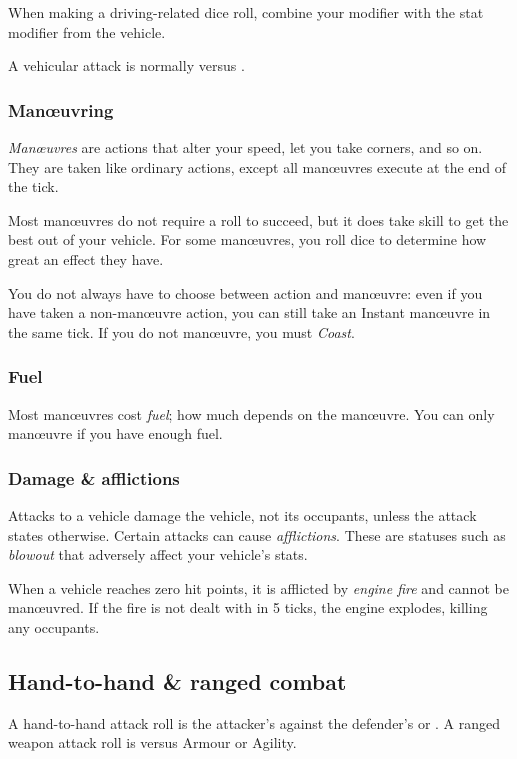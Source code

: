 \documentclass[10pt, a4paper, twocolumn]{article}
\begin{document}
When making a driving-related dice roll, combine your 
modifier with the stat modifier from the vehicle.

A vehicular attack is normally  versus .

\subsubsection{Man\oe{}uvring}
\emph{Man\oe{}uvres} are actions that alter your speed, let you take corners,
and so on. They are taken like ordinary actions, except all man\oe{}uvres
execute at the end of the tick.

Most man\oe{}uvres do not require a roll to succeed, but it does take skill to
get the best out of your vehicle. For some man\oe{}uvres, you roll dice to
determine how great an effect they have.

You do not always have to choose between action and man\oe{}uvre: even if you
have taken a non-man\oe{}uvre action, you can still take an Instant man\oe{}uvre
in the same tick. If you do not man\oe{}uvre, you must \emph{Coast}.

\subsubsection{Fuel}
Most man\oe{}uvres cost \emph{fuel}; how much depends on the man\oe{}uvre. You
can only man\oe{}uvre if you have enough fuel.

\subsubsection{Damage \& afflictions}
Attacks to a vehicle damage the vehicle, not its occupants, unless the attack
states otherwise. Certain attacks can cause \emph{afflictions}. These are
statuses such as \emph{blowout} that adversely affect your vehicle's stats.

When a vehicle reaches zero hit points, it is afflicted by \emph{engine fire}
and cannot be man\oe{}uvred. If the fire is not dealt with in 5 ticks, the
engine explodes, killing any occupants.

\subsection{Hand-to-hand \& ranged combat}
A hand-to-hand attack roll is the attacker's  against the defender's  or . A ranged weapon attack roll is 
versus Armour or Agility. 
\end{document}
